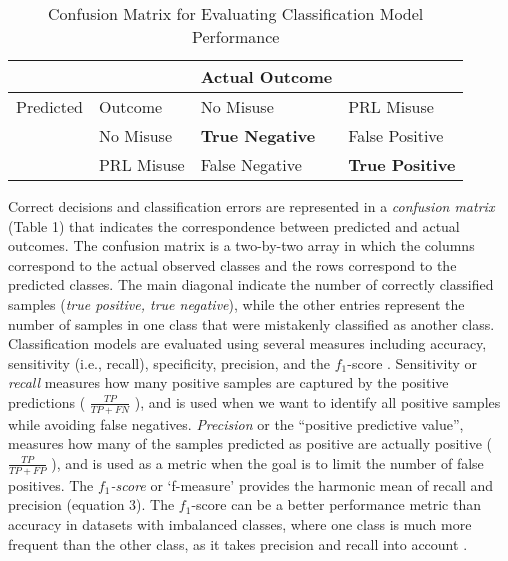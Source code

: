 \documentclass[sigconf]{acmart}
\begin{document}

\begin{table}
  \caption{Confusion Matrix for Evaluating Classification Model Performance}
  \label{tab:freq}
  \begin{tabular}{llll}
    \toprule
     & &  Actual Outcome & \\
    \midrule
    Predicted & Outcome & No Misuse & PRL Misuse \\
    \midrule
    & No Misuse & \textbf{True Negative} & False Positive \\
    \midrule
    & PRL Misuse & False Negative & \textbf{True Positive} \\
    \bottomrule
  \end{tabular}
\end{table}


Correct decisions and classification errors are represented in a 
\emph{confusion matrix} (Table 1) that indicates the correspondence between 
predicted and actual outcomes. The confusion matrix is a two-by-two array in 
which the columns correspond to the actual observed classes and the rows 
correspond to the predicted classes. The main diagonal indicate the number of 
correctly classified samples (\emph{true positive, true negative}), while the 
other entries represent the number of samples in one class that were mistakenly 
classified as another class. Classification models are evaluated using several 
measures including accuracy, sensitivity (i.e., recall), specificity, precision, 
and the $f_1$-score \cite{kuhn13, wiki18}. Sensitivity or \emph{recall} 
measures how many positive samples are captured by the positive predictions 
( \(\frac{TP}{TP+FN}\) ), and is used when we want to identify all positive 
samples while avoiding false negatives. \emph{Precision} or the 
``positive predictive value'', measures how many of the samples predicted 
as positive are actually positive ( \(\frac{TP}{TP+FP}\) ), and is used as 
a metric when the goal is to limit the number of false positives. The 
\emph{$f_1$-score} or `f-measure' provides the harmonic mean of recall and 
precision (equation 3). The $f_1$-score can be a better performance metric 
than accuracy in datasets with imbalanced classes, where one class is much 
more frequent than the other class, as it takes precision and recall into
account \cite{muller17}.
\end{document}
